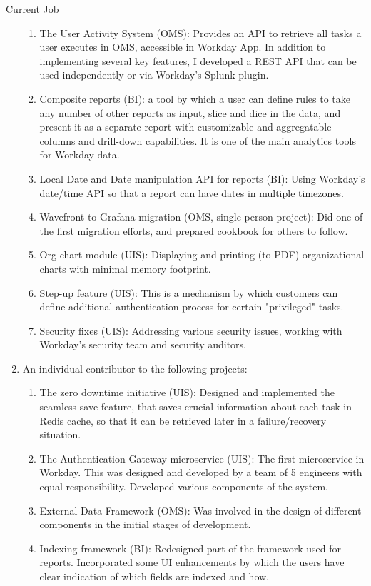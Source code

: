 \documentclass{resume}
\begin{document}
\begin{category}{Current Job}
\begin{enumerate}
\begin{enumerate}
\item The User Activity System (OMS): Provides an API to retrieve all tasks a user executes in OMS, accessible in Workday App.  In addition to implementing several key features, I developed a REST API that can be used independently or via Workday's Splunk plugin.
\item Composite reports (BI): a tool by which a user can define rules
  to take any number of other reports as input, slice and dice in the
  data, and present it as a separate report with customizable and
  aggregatable columns and drill-down capabilities. It is one of the
  main analytics tools for Workday data.
\item Local Date and Date manipulation API for reports (BI):  Using Workday's date/time API so that a report can have dates in multiple timezones.
\item Wavefront to Grafana migration (OMS, single-person project): Did one of the first
  migration efforts, and prepared cookbook for others to follow.
\item Org chart module (UIS): Displaying and printing (to PDF) organizational charts with minimal memory footprint.
\item Step-up feature (UIS): This is a mechanism by which customers can define additional authentication process for certain "privileged" tasks.
\item Security fixes (UIS): Addressing various security issues, working with Workday's security team and security auditors.
\end{enumerate}
\item An individual contributor to the following projects:
\begin{enumerate}
\item The zero downtime initiative (UIS): Designed and implemented the seamless save feature, that saves crucial information about each task in Redis cache, so that it can be retrieved later in a failure/recovery situation.
\item The Authentication Gateway microservice (UIS): The first microservice in Workday.  This was designed and developed by a team of 5 engineers with equal responsibility. Developed various components of the system.
\item External Data Framework (OMS): Was involved in the design of different components in the initial stages of development.
\item Indexing framework (BI): Redesigned part of the framework used for reports.  Incorporated some UI enhancements by which the users have clear indication of which fields are indexed and how.

\end{enumerate}
\end{enumerate}
\end{category}
\end{document}
